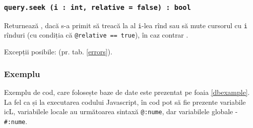 \subsubsection{\texttt{query.seek (i : int, relative = false) : bool}}

Returnează \true, dacă s-a primit să treacă la al \texttt{i}-lea rînd sau să mute cursorul cu \texttt{i} rînduri (cu condiția că \texttt{@relative == true}), în caz contrar \false.

Excepții posibile:  (pr. tab. \ref{errors}).

\subsubsection{Exemplu}

Exemplu de cod, care folosește baze de date este prezentat pe foaia \ref{dbexample}. La fel ca și la executarea codului Javascript, în cod pot să fie prezente variabile icL, variabilele locale au următoarea sintaxă \texttt{@:nume}, dar variabilele globale - \texttt{#:nume}.

\newpage
\begin{sourcecode}
    \label{dbexample}
    \inputminted[linenos]{icl}{../sources/dbexample.icL}
\end{sourcecode}

